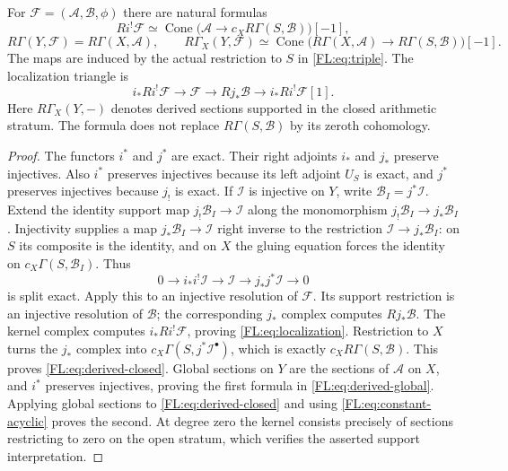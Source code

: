\begin{theorem}
\label{FL:thm:derived-finite}
For $\mathcal F=(\mathcal A,\mathcal B,\phi)$ there are natural formulas
\[
 Ri^!\mathcal F\simeq
 \operatorname{Cone}\bigl(\mathcal A\longrightarrow
          c_XR\Gamma(S,\mathcal B)\bigr)[-1],
 \tag{FL11}\label{FL:eq:derived-closed}
\]
\[
 R\Gamma(Y,\mathcal F)=R\Gamma(X,\mathcal A),\qquad
 R\Gamma_X(Y,\mathcal F)\simeq
 \operatorname{Cone}\bigl(R\Gamma(X,\mathcal A)
                \longrightarrow R\Gamma(S,\mathcal B)\bigr)[-1].
 \tag{FL12}\label{FL:eq:derived-global}
\]
The maps are induced by the actual restriction to $S$ in
\eqref{FL:eq:triple}. The localization triangle is
\[
 i_*Ri^!\mathcal F\longrightarrow\mathcal F
 \longrightarrow Rj_*\mathcal B\longrightarrow i_*Ri^!\mathcal F[1].
 \tag{FL13}\label{FL:eq:localization}
\]
Here $R\Gamma_X(Y,-)$ denotes derived sections supported in the closed
arithmetic stratum. The formula does not replace $R\Gamma(S,\mathcal B)$
by its zeroth cohomology.
\end{theorem}
\begin{proof}
The functors $i^*$ and $j^*$ are exact. Their right adjoints $i_*$ and
$j_*$ preserve injectives. Also $i^*$ preserves injectives because
its left adjoint $U_S$ is exact, and $j^*$ preserves injectives because
$j_!$ is exact.
If $\mathcal I$ is injective on $Y$, write
$\mathcal B_I=j^*\mathcal I$. Extend the identity support map
$j_!\mathcal B_I\to\mathcal I$ along the monomorphism
$j_!\mathcal B_I\to j_*\mathcal B_I$. Injectivity supplies a map
$j_*\mathcal B_I\to\mathcal I$ right inverse to the restriction
$\mathcal I\to j_*\mathcal B_I$: on $S$ its composite is the identity,
and on $X$ the gluing equation forces the identity on
$c_X\Gamma(S,\mathcal B_I)$. Thus
\[
 0\to i_*i^!\mathcal I\to\mathcal I\to j_*j^*\mathcal I\to0
\]
is split exact. Apply this to an injective resolution of $\mathcal F$.
Its support restriction is an injective resolution of $\mathcal B$;
the corresponding $j_*$ complex computes $Rj_*\mathcal B$.
The kernel complex computes $i_*Ri^!\mathcal F$, proving
\eqref{FL:eq:localization}. Restriction to $X$ turns the $j_*$ complex
into $c_X\Gamma(S,j^*\mathcal I^\bullet)$, which is exactly
$c_XR\Gamma(S,\mathcal B)$. This proves
\eqref{FL:eq:derived-closed}. Global sections on $Y$ are the sections
of $\mathcal A$ on $X$, and $i^*$ preserves injectives, proving the
first formula in \eqref{FL:eq:derived-global}. Applying global sections
to \eqref{FL:eq:derived-closed} and using
\eqref{FL:eq:constant-acyclic} proves the second. At degree zero the
kernel consists precisely of sections restricting to zero on the
open stratum, which verifies the asserted support interpretation.
\end{proof}

